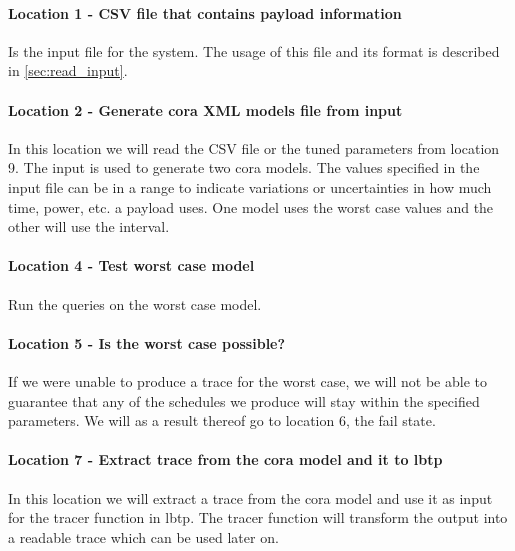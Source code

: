 \paragraph{Location 1 - CSV file that contains payload information} 
Is the input file for the system. 
The usage of this file and its format is described in \cref{sec:read_input}.

\paragraph{Location 2 - Generate \gls{cora} XML models file from input} 
In this location we will read the CSV file or the tuned parameters from location 9. 
The input is used to generate two \gls{cora} models.
The values specified in the input file can be in a range to indicate variations or uncertainties in how much time, power, etc. a payload uses.
One model uses the worst case values and the other will use the interval. 


\paragraph{Location 4 - Test worst case model} 
Run the queries on the worst case model.

\paragraph{Location 5 - Is the worst case possible?} 
If we were unable to produce a trace for the worst case, we will not be able to guarantee that any of the schedules we produce will stay within the specified parameters. 
We will as a result thereof go to location 6, the fail state.

\paragraph{Location 7 - Extract trace from the \gls{cora} model and it to \acrshort{lbtp}} 
In this location we will extract a trace from the \gls{cora} model and use it as input for the tracer function in \acrshort{lbtp}. 
The tracer function will transform the output into a readable trace which can be used later on.

